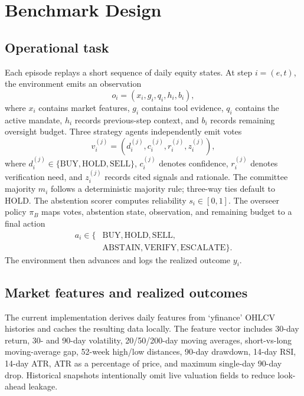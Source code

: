 \documentclass[10pt,twocolumn]{article}
\begin{document}
\section{Benchmark Design}

\subsection{Operational task}

Each episode replays a short sequence of daily equity states. At step \(i=(e,t)\), the environment emits an observation
\[
o_i = (x_i, g_i, q_i, h_i, b_i),
\]
where \(x_i\) contains market features, \(g_i\) contains tool evidence, \(q_i\) contains the active mandate, \(h_i\) records previous-step context, and \(b_i\) records remaining oversight budget. Three strategy agents independently emit votes
\[
v_i^{(j)} = (d_i^{(j)}, c_i^{(j)}, r_i^{(j)}, z_i^{(j)}),
\]
where \(d_i^{(j)} \in \{\mathrm{BUY},\mathrm{HOLD},\mathrm{SELL}\}\), \(c_i^{(j)}\) denotes confidence, \(r_i^{(j)}\) denotes verification need, and \(z_i^{(j)}\) records cited signals and rationale. The committee majority \(m_i\) follows a deterministic majority rule; three-way ties default to HOLD. The abstention scorer computes reliability \(s_i \in [0,1]\). The overseer policy \(\pi_B\) maps votes, abstention state, observation, and remaining budget to a final action
\begin{equation}
\begin{split}
a_i \in \{&\mathrm{BUY},\mathrm{HOLD},\mathrm{SELL},\\
&\mathrm{ABSTAIN},\mathrm{VERIFY},\mathrm{ESCALATE}\}.
\end{split}
\end{equation}
The environment then advances and logs the realized outcome \(y_i\).

\subsection{Market features and realized outcomes}

The current implementation derives daily features from `yfinance' OHLCV histories and caches the resulting data locally. The feature vector includes 30-day return, 30- and 90-day volatility, 20/50/200-day moving averages, short-vs-long moving-average gap, 52-week high/low distances, 90-day drawdown, 14-day RSI, 14-day ATR, ATR as a percentage of price, and maximum single-day 90-day drop. Historical snapshots intentionally omit live valuation fields to reduce look-ahead leakage.
\end{document}
